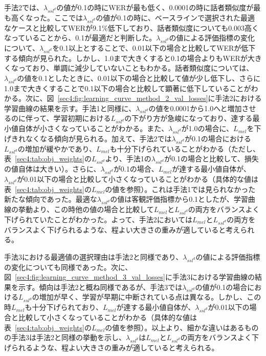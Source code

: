 \documentclass[12pt]{jarticle}
\numberwithin{equation}{section}    %
\numberwithin{figure}{section}      %
\numberwithin{table}{section}      %
\begin{document}
手法2では、$\lambda_{ssl^{d}}$の値が0.1の時にWERが最も低く、0.0001の時に話者類似度が最も高くなった。ここでは$\lambda_{ssl^{d}}$の値が0.1の時に、ベースラインで選択された最適なケースと比較してWERが9.1\%低下しており、話者類似度についても0.003高くなっていることから、0.1が最適だと判断した。$\lambda_{ssl^{d}}$の値による評価指標の変化について、$\lambda_{ssl^{d}}$を0.1以上とすることで、0.01以下の場合と比較してWERが低下する傾向が見られた。しかし、1.0まで大きくすると0.1の場合よりもWERが大きくなっており、単調に減少していないこともわかる。話者類似度については、$\lambda_{ssl^{d}}$の値を0.1としたときに、0.01以下の場合と比較して値が少し低下し、さらに1.0まで大きくすることで0.1以下の場合と比較して顕著に低下していることがわかる。次に、図~\ref{sec4:fig:learning_curve_method_2_val_losses}に手法2における学習曲線の結果を示す。手法1と同様に、$\lambda_{ssl^{d}}$の値を0.0001から1.0へと増加させるのに伴って、学習初期における$L_{ssl^{d}}$の下がり方が急峻になっており、達する最小値自体が小さくなっていることがわかる。また、$\lambda_{ssl^{d}}$が1.0の場合に、$L_{mel}$を下げきれなくなる傾向が見られる。加えて、手法2では$\lambda_{ssl^{d}}$が0.1の場合における$L_{ssl^{d}}$の増加が緩やかであり、$L_{mel}$も十分下げられていることがわかる（ただし、表~\ref{sec4:tab:obj_weights}の$L_{ssl^{d}}$より、手法1の$\lambda_{ssl^{d}}$が0.1の場合と比較して、損失の値自体は大きい）。さらに、$\lambda_{ssl^{d}}$が0.1の場合、$L_{mel}$が達する最小値自体が、$\lambda_{ssl^{d}}$が0.01以下の場合と比較して小さくなっていることがわかる（具体的な値は表~\ref{sec4:tab:obj_weights}の$L_{mel}$の値を参照）。これは手法1では見られなかった新たな傾向であった。最適な$\lambda_{ssl^{d}}$の値は客観評価指標から0.1としたが、学習曲線の挙動より、この時他の値の場合と比較して$L_{mel}$と$L_{ssl^{d}}$の両方をバランスよく下げられていたことがわかった。よって、手法2においては$L_{mel}$と$L_{ssl^{d}}$の両方をバランスよく下げられるような、程よい大きさの重みが適していると考えられる。

手法3における最適値の選択理由は手法2と同様であり、$\lambda_{ssl^{d}}$の値による評価指標の変化についても同様であった。次に、図~\ref{sec4:fig:learning_curve_method_3_val_losses}に手法3における学習曲線の結果を示す。傾向は手法2と概ね同様であるが、手法3では$\lambda_{ssl^{d}}$の値が0.1の場合における$L_{ssl^{d}}$の増加が早く、学習が早期に中断されている点は異なる。しかし、この時$L_{mel}$も十分下げられており、$L_{mel}$が達する最小値自体が、$\lambda_{ssl^{d}}$が0.01以下の場合と比較して小さくなっていることがわかる（具体的な値は表~\ref{sec4:tab:obj_weights}の$L_{mel}$の値を参照）。以上より、細かな違いはあるものの手法3は手法2と同様の挙動を示し、$\lambda_{ssl^{d}}$は$L_{mel}$と$L_{ssl^{d}}$の両方をバランスよく下げられるような、程よい大きさの重みが適していると考えられる。
\end{document}
